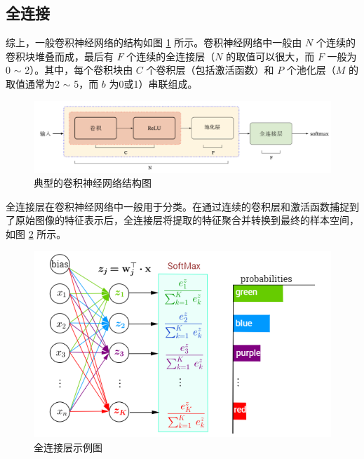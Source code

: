 \subsection{全连接}

综上，一般卷积神经网络的结构如图 \ref{fig:fig2-6} 所示。卷积神经网络中一般由 $N$ 个连续的卷积块堆叠而成，最后有 $F$ 个连续的全连接层（$N$ 的取值可以很大，而 $F$ 一般为0 $\sim$ 2）。其中，每个卷积块由 $C$ 个卷积层（包括激活函数）和 $P$ 个池化层（$M$ 的取值通常为2 $\sim$ 5，而 $b$ 为0或1）串联组成。

\begin{figure}[!htbp]
	\centering
	\includegraphics{figures/7.png}
	\caption{典型的卷积神经网络结构图}
	\label{fig:fig2-6}
	\vspace{-0.8cm}  %
\end{figure}

\newpage
全连接层在卷积神经网络中一般用于分类。在通过连续的卷积层和激活函数捕捉到了原始图像的特征表示后，全连接层将提取的特征聚合并转换到最终的样本空间，如图 \ref{fig:fig2-7} 所示。

\begin{figure}[!htbp]
	\centering
	\includegraphics[scale=0.55]{figures/8.png}
	\caption{全连接层示例图}
	\label{fig:fig2-7}
	\vspace{-0.8cm}  %
\end{figure}

